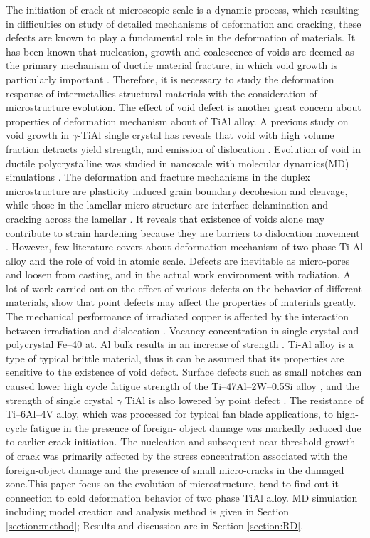 \documentclass[metals,article,submit,moreauthors,pdftex,10pt,a4paper]{Definitions/mdpi}
\begin{document}
The initiation of crack at microscopic scale is a dynamic process, which resulting in difficulties on study of detailed mechanisms of deformation and cracking, these defects are known to play a fundamental role in the deformation of materials. It has been known that nucleation, growth and coalescence of voids are deemed as the primary mechanism of ductile material fracture, in which void growth is particularly important \cite{Hempel2017a}. Therefore, it is necessary to study the deformation response of intermetallics structural materials with the consideration of microstructure evolution. The effect of void defect is another great concern about properties of deformation mechanism about of TiAl alloy. A previous study on void growth in $\gamma$-TiAl single crystal has reveals that void with high volume fraction detracts yield strength, and emission of dislocation \cite{Tang2014, Xu2011}. Evolution of void in ductile polycrystalline was studied in nanoscale with molecular dynamics(MD) simulations \cite{Jing2018a,Elkhateeb2018}. The deformation and fracture mechanisms in the duplex microstructure are plasticity induced grain boundary decohesion and cleavage, while those in the lamellar micro-structure are interface delamination and cracking across the lamellar \cite{Tang2014}. It reveals that existence of voids alone may contribute to strain hardening because they are barriers to dislocation movement \cite{Xiong2015}. However, few literature covers about deformation mechanism of two phase Ti-Al alloy and the role of void in atomic scale. Defects are inevitable as micro-pores and loosen from casting, and in the actual work environment with radiation. A lot of work carried out on the  effect of various defects on the behavior of different materials, show that point defects may affect the properties of materials greatly. The mechanical performance of irradiated copper is affected by the interaction between irradiation and dislocation \cite{Kiener2011}. Vacancy concentration in single crystal and polycrystal Fe–40 at. Al bulk results in an increase of strength \cite{Yang1998}. Ti-Al alloy is a type of typical brittle material, thus it can be assumed that its properties are sensitive to the existence of void defect. Surface defects such as small notches can caused lower high cycle fatigue strength of the Ti–47Al–2W–0.5Si alloy \cite{Nazmy2001}, and the strength of single crystal $\gamma$  TiAl is also lowered by point defect \cite{Wu2016}. The resistance of Ti–6Al–4V alloy, which was processed for typical fan blade applications, to high-cycle fatigue in the presence of foreign- object damage was markedly reduced due to earlier crack initiation.  The nucleation and subsequent near-threshold growth of crack was primarily affected by the stress concentration associated with the foreign-object damage and the presence of small micro-cracks in the damaged zone.This paper focus on the evolution of microstructure, tend to find out it connection to cold deformation behavior of two phase TiAl alloy. MD simulation including model creation and analysis method is given in Section \ref{section:method}; Results and discussion are in Section \ref{section:RD}.
\end{document}
